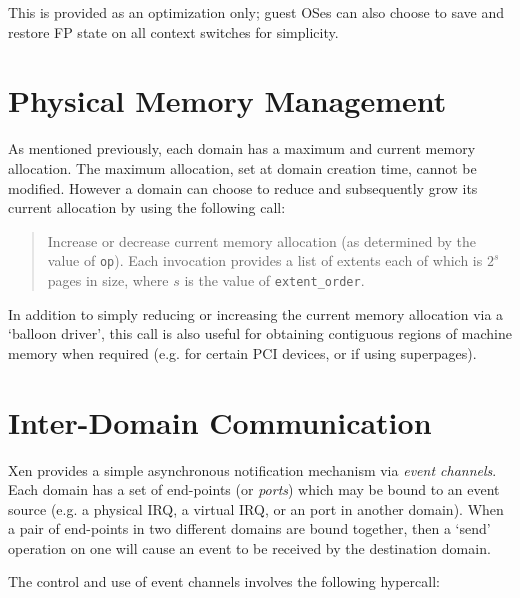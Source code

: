 \documentclass[11pt,twoside,final,openright]{xenstyle}
\begin{document}
This is provided as an optimization only; guest OSes can also choose
to save and restore FP state on all context switches for simplicity. 


\section{Physical Memory Management}

As mentioned previously, each domain has a maximum and current 
memory allocation. The maximum allocation, set at domain creation 
time, cannot be modified. However a domain can choose to reduce 
and subsequently grow its current allocation by using the
following call: 

\begin{quote} 

Increase or decrease current memory allocation (as determined by 
the value of {\tt op}). Each invocation provides a list of 
extents each of which is $2^s$ pages in size, 
where $s$ is the value of {\tt extent\_order}. 

\end{quote} 

In addition to simply reducing or increasing the current memory
allocation via a `balloon driver', this call is also useful for 
obtaining contiguous regions of machine memory when required (e.g. 
for certain PCI devices, or if using superpages).  


\section{Inter-Domain Communication}
\label{s:idc} 

Xen provides a simple asynchronous notification mechanism via
\emph{event channels}. Each domain has a set of end-points (or
\emph{ports}) which may be bound to an event source (e.g. a physical
IRQ, a virtual IRQ, or an port in another domain). When a pair of
end-points in two different domains are bound together, then a `send'
operation on one will cause an event to be received by the destination
domain.

The control and use of event channels involves the following hypercall: 
\end{document}
